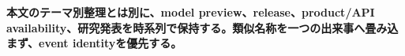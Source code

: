\noindent\textbf{本文のテーマ別整理とは別に、model preview、release、product/API availability、研究発表を時系列で保持する。類似名称を一つの出来事へ畳み込まず、event identityを優先する。}\autocite{src-10b59b402b80,src-c3a08c57269d}

